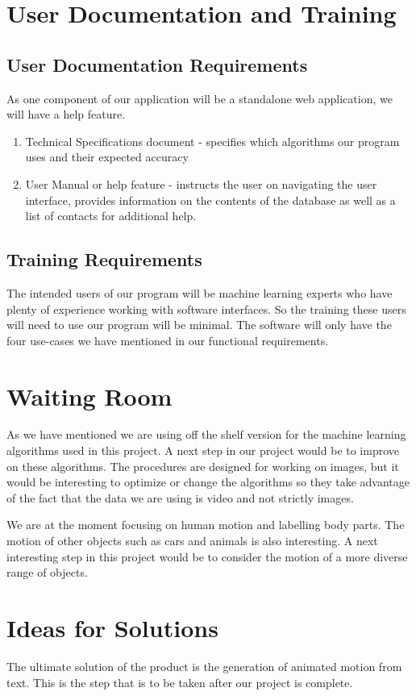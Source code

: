 \documentclass{scrreprt}
\providecommand{\tightlist}{%
  \setlength{\itemsep}{0pt}\setlength{\parskip}{0pt}}
\begin{document}
\section{User Documentation and Training}

\subsection{User Documentation Requirements}

{As one component of our application will be a standalone web application, we
will have a help feature.}

\begin{enumerate}
\tightlist
\item
  {Technical Specifications document - specifies which algorithms our
  program uses and their expected accuracy}
\item
  {User Manual or help feature - instructs the user on navigating the
  user interface, provides information on the contents of the database as well
  as a list of contacts for additional help.}
\end{enumerate}

\subsection{Training Requirements}

{The intended users of our program will be machine learning experts who
have plenty of experience working with software interfaces. So the
training these users will need to use our program will be minimal. The
software will only have the four use-cases we have mentioned in our
functional requirements.}

\section{Waiting Room}

{As we have mentioned we are using off the shelf version for the machine
learning algorithms used in this project. A next step in our project would be
to improve on these algorithms. The procedures are designed for working on
images, but it would be interesting to optimize or change the algorithms so they
take advantage of the fact that the data we are using is video and not strictly
images.}

{We are at the moment focusing on human motion and labelling body
parts. The motion of other objects such as cars and animals is also
interesting. A next interesting step in this project would be to
consider the motion of a more diverse range of objects.}

\section{Ideas for Solutions}

{The ultimate solution of the product is the generation of animated motion from
text. This is the step that is to be taken after our project is complete.}



\end{document}

